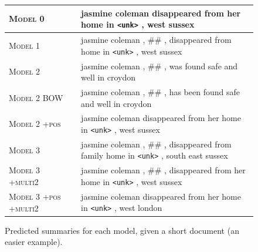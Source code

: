 \documentclass[12pt]{report}
\begin{document}
\begin{figure}[p]
\begin{tabular}{ll p{}}
\textsc{Model 0} & & jasmine coleman disappeared from her home in \texttt{<unk>} , west sussex \\
\midrule
 \textsc{Model 1} & & jasmine coleman , \#\# , disappeared from home in \texttt{<unk>} , west sussex \\
\midrule
\textsc{Model 2} & & jasmine coleman , \#\# , was found safe and well in croydon \\
\textsc{Model 2 BOW} & & jasmine coleman , \#\# , has been found safe and well in croydon \\
\textsc{Model 2 +pos} & & jasmine coleman disappeared from her home in \texttt{<unk>} , west sussex \\
\midrule
\textsc{Model 3} & & jasmine coleman , \#\# , disappeared from family home in \texttt{<unk>} , south east sussex \\
\textsc{Model 3 +multi2} & & jasmine coleman , \#\# , disappeared from her home in \texttt{<unk>} , west sussex \\
\textsc{Model 3 +pos +multi2} & &  jasmine coleman disappeared from her home in \texttt{<unk>} , west london\\
\bottomrule
\end{tabular}
\caption[Predicted Summaries 1]{Predicted summaries for each model, given a short document (an easier example).}
\label{fig:predicted_summaries1}
\end{figure}
\end{document}
